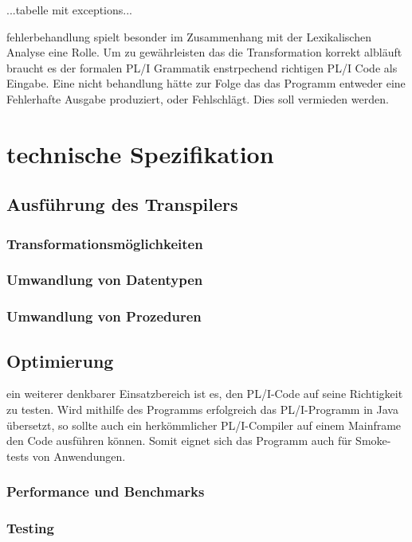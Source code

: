 ...tabelle mit exceptions...

fehlerbehandlung spielt besonder im Zusammenhang mit der Lexikalischen Analyse eine Rolle. Um zu gewährleisten das die Transformation korrekt albläuft braucht es der formalen PL/I Grammatik enstrpechend richtigen PL/I Code als Eingabe. Eine nicht behandlung hätte zur Folge das das Programm entweder eine Fehlerhafte Ausgabe produziert, oder Fehlschlägt. Dies soll vermieden werden.

\section{technische Spezifikation}
	\subsection{Ausführung des Transpilers}
		\subsubsection{Transformationsmöglichkeiten}
		\subsubsection{Umwandlung von Datentypen}
		\subsubsection{Umwandlung von Prozeduren}
	\subsection{Optimierung}
	ein weiterer denkbarer Einsatzbereich ist es, den PL/I-Code auf seine Richtigkeit zu testen. Wird mithilfe des Programms erfolgreich das PL/I-Programm in Java übersetzt, so sollte auch ein herkömmlicher PL/I-Compiler auf einem Mainframe den Code ausführen können. Somit eignet sich das Programm auch für Smoke-tests von Anwendungen.
		\subsubsection{Performance und Benchmarks}
		\subsubsection{Testing}
